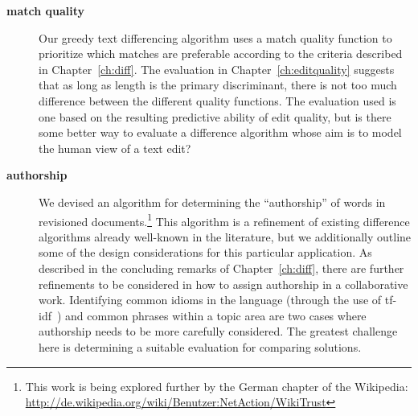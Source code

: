 \begin{description}
\item[\textbf{match quality}] Our greedy text differencing algorithm
    uses a match quality function to prioritize which matches are
    preferable according to the criteria described in Chapter~\ref{ch:diff}.
    The evaluation in Chapter~\ref{ch:editquality}
    suggests that as long as length
    is the primary discriminant, there is not too much difference
    between the different quality functions.
    The evaluation used is one based on the resulting predictive ability
    of edit quality, but is there some better way to evaluate a difference
    algorithm whose aim is to model the human view of a text edit?

\item[\textbf{authorship}]
    We devised an algorithm for determining the ``authorship'' of words in
    revisioned documents.\footnote{This work is being explored further
      by the German chapter of the Wikipedia: \\
        \url{http://de.wikipedia.org/wiki/Benutzer:NetAction/WikiTrust}}
    This algorithm is a refinement of existing difference algorithms
    already well-known in the literature, but we additionally outline
    some of the design considerations for this particular application.
    As described in the concluding remarks of
    Chapter~\ref{ch:diff}, there are further refinements to be
    considered in how to assign authorship in a collaborative work.
    Identifying common idioms in the language (\eg through the use of
    tf-idf~\cite{Jones1972}) and common phrases within a topic area
    are two cases where authorship needs to be more carefully considered.
    The greatest challenge here is
    determining a suitable evaluation for comparing solutions.

\end{description}

